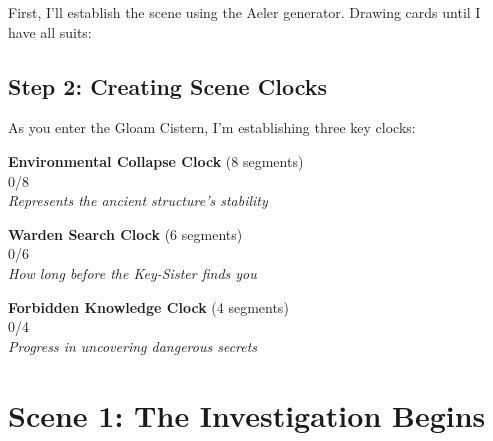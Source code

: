  First, I'll establish the scene using the Aeler generator. Drawing cards until I have all suits:



\subsection*{Step 2: Creating Scene Clocks}

 As you enter the Gloam Cistern, I'm establishing three key clocks:

\begin{center}
\textbf{Environmental Collapse Clock} (8 segments)\\
\fbox{\clocksegment\clocksegment\clocksegment\clocksegment\clocksegment\clocksegment\clocksegment\clocksegment} 0/8\\
\textit{Represents the ancient structure's stability}
\end{center}

\begin{center}
\textbf{Warden Search Clock} (6 segments)\\
\fbox{\clocksegment\clocksegment\clocksegment\clocksegment\clocksegment\clocksegment} 0/6\\
\textit{How long before the Key-Sister finds you}
\end{center}

\begin{center}
\textbf{Forbidden Knowledge Clock} (4 segments)\\
\fbox{\clocksegment\clocksegment\clocksegment\clocksegment} 0/4\\
\textit{Progress in uncovering dangerous secrets}
\end{center}


\section*{Scene 1: The Investigation Begins}

